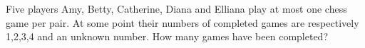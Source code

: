 Five players Amy, Betty, Catherine, Diana and Elliana play at most one chess game per pair. At some point their numbers of completed games are respectively 1,2,3,4 and an unknown number. How many games have been completed?
